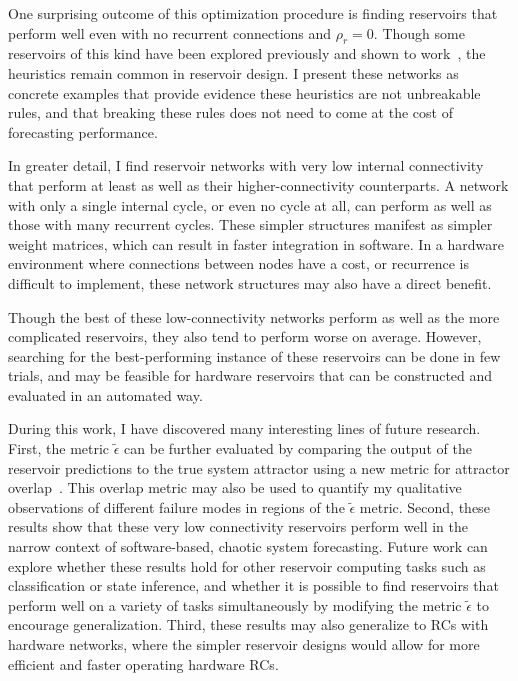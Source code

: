 One surprising outcome of this optimization procedure is finding
reservoirs that perform well even with no recurrent connections and
$\rho_r=0$.  Though some reservoirs of this kind have been explored
previously and shown to work~\cite{pathak2017,rodan2011}, the
heuristics remain common in reservoir design. I present these networks
as concrete examples that provide evidence these heuristics are not
unbreakable rules, and that breaking these rules does not need to come
at the cost of forecasting performance.

In greater detail, I find reservoir networks with very low internal
connectivity that perform at least as well as their
higher-connectivity counterparts. A network with only a single
internal cycle, or even no cycle at all, can perform as well as those
with many recurrent cycles. These simpler structures manifest as
simpler weight matrices, which can result in faster integration in
software. In a hardware environment where connections between nodes
have a cost, or recurrence is difficult to implement, these network
structures may also have a direct benefit.

Though the best of these low-connectivity networks perform as well
as the more complicated reservoirs, they also tend to perform worse on
average. However, searching for the best-performing instance of these
reservoirs can be done in few trials, and may be feasible for hardware
reservoirs that can be constructed and evaluated in an automated way.

During this work, I have discovered many interesting lines of future
research. First, the metric $\tilde{\epsilon}$ can be further evaluated by
comparing the output of the reservoir predictions to the true system
attractor using a new metric for attractor overlap~\cite{ishar2019}.
This overlap metric may also be used to quantify my qualitative
observations of different failure modes in regions of the
$\tilde{\epsilon}$ metric. Second, these results show that these very
low connectivity reservoirs perform well in the narrow context of
software-based, chaotic system forecasting. Future work can explore
whether these results hold for other reservoir computing tasks such as
classification or state inference, and whether it is possible to find reservoirs that
perform well on a variety of tasks simultaneously by modifying the
metric $\tilde{\epsilon}$ to encourage generalization. Third, these
results may also generalize to RCs with hardware networks, where the
simpler reservoir designs would allow for more efficient and faster
operating hardware RCs.

